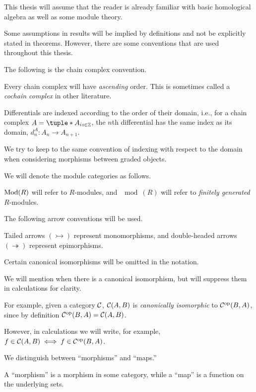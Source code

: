 This thesis will assume that the reader is already familiar with basic homological algebra as well as some module theory.

Some assumptions in results will be implied by definitions and not be explicitly stated in theorems. However, there are some conventions that are used throughout this thesis.

The following is the chain complex convention.
\begin{notation}
    \label{not:chain_complex}
    Every chain complex will have \emph{ascending} order. This is sometimes called a \emph{cochain complex} in other literature.

    Differentials are indexed according to the order of their domain, i.e., for a chain complex \( A = \tuple*{A_i}_{i \in \Zb} \), the \( n \)th differential has the same index as its domain, \( d_n^A: A_n \to A_{n + 1} \).
    
    We try to keep to the same convention of indexing with respect to the domain when considering morphisms between graded objects.
\end{notation}

We will denote the module categories as follows.
\begin{notation}
    \( \operatorname{Mod}(R) \) will refer to \( R \)-modules, and \( \mod(R) \) will refer to \emph{finitely generated} \( R \)-modules.
\end{notation}

The following arrow conventions will be used.
\begin{notation}
    Tailed arrows \( (\rightarrowtail) \) represent monomorphisms, and double-headed arrows \( (\twoheadrightarrow) \) represent epimorphisms.
\end{notation}

Certain canonical isomorphisms will be omitted in the notation.
\begin{notation}
    \label{not:suppress_canonical_isomorphisms}
    We will mention when there is a canonical isomorphism, but will suppress them in calculations for clarity.

    For example, given a category \( {\mathcal{C}} \), \( {\mathcal{C}}(A, B) \) is \emph{canonically isomorphic} to \( {\mathcal{C}}^{\operatorname{op}}(B, A) \), since by definition \( {\mathcal{C}}^{\operatorname{op}}(B, A) = {\mathcal{C}}(A, B) \).

    However, in calculations we will write, for example, \( f \in {\mathcal{C}}(A, B) \iff f \in {\mathcal{C}}^{\operatorname{op}}(B, A) \).
\end{notation}

We distinguish between ``morphisms'' and ``maps.''
\begin{notation}
    A ``morphism'' is a morphism in some category, while a ``map'' is a function on the underlying sets.
\end{notation}

